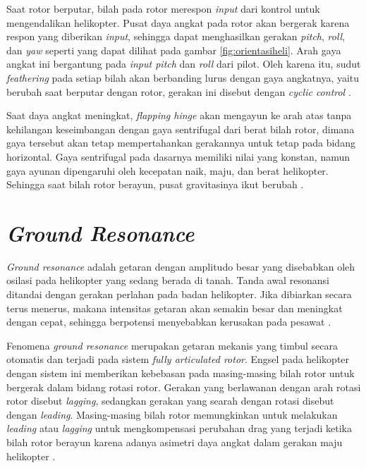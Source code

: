 Saat rotor berputar, bilah pada rotor merespon \textit{input} dari kontrol untuk mengendalikan helikopter. Pusat daya angkat pada rotor akan bergerak karena respon yang diberikan \textit{input}, sehingga dapat menghasilkan gerakan \textit{pitch}, \textit{roll}, dan \textit{yaw} seperti yang dapat dilihat pada gambar \ref{fig:orientasiheli}. Arah gaya angkat ini bergantung pada \textit{input pitch} dan \textit{roll} dari pilot. Oleh karena itu, sudut \textit{feathering} pada setiap bilah akan berbanding lurus dengan gaya angkatnya, yaitu berubah saat berputar dengan rotor, gerakan ini disebut dengan \textit{cyclic control} \cite{handbook}.

Saat daya angkat meningkat, \textit{flapping hinge} akan mengayun ke arah atas tanpa kehilangan keseimbangan dengan gaya sentrifugal dari berat bilah rotor, dimana gaya tersebut akan tetap mempertahankan gerakannya untuk tetap pada bidang horizontal. Gaya sentrifugal pada dasarnya memiliki nilai yang konstan, namun gaya ayunan dipengaruhi oleh kecepatan naik, maju, dan berat helikopter. Sehingga saat bilah rotor berayun, pusat gravitasinya ikut berubah \cite{handbook}.

\section{\textit{Ground Resonance}}
\label{sec:groundresonance}

\textit{Ground resonance} adalah getaran dengan amplitudo besar yang disebabkan oleh osilasi pada helikopter yang sedang berada di tanah. Tanda awal resonansi ditandai dengan gerakan perlahan pada badan helikopter. Jika dibiarkan secara terus menerus, makana intensitas getaran akan semakin besar dan meningkat dengan cepat, sehingga berpotensi menyebabkan kerusakan pada pesawat \cite{wagtendonk2006principles}.

Fenomena \textit{ground resonance} merupakan getaran mekanis yang timbul secara otomatis dan terjadi pada sistem \textit{fully articulated rotor}. Engsel pada helikopter dengan sistem ini memberikan kebebasan pada masing-masing bilah rotor untuk bergerak dalam bidang rotasi rotor. Gerakan yang berlawanan dengan arah rotasi rotor disebut \textit{lagging}, sedangkan gerakan yang searah dengan rotasi disebut dengan \textit{leading}. Masing-masing bilah rotor memungkinkan untuk melakukan \textit{leading} atau \textit{lagging} untuk mengkompensasi perubahan drag yang terjadi ketika bilah rotor berayun karena adanya asimetri daya angkat dalam gerakan maju helikopter \cite{Eckert2007AnalyticalAA}.

